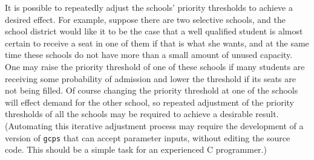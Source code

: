 \documentclass[12pt]{article}
\theoremstyle{definition}
\begin{document}
It is possible to repeatedly adjust the schools' priority thresholds
to achieve a desired effect.  For example, suppose there are two
selective schools, and the school district would like it to be the
case that a well qualified student is almost certain to receive a seat
in one of them if that is what she wants, and at the same time these
schools do not have more than a small amount of unused capacity.  One
may raise the priority threshold of one of these schools if many
students are receiving some probability of admission and lower the
threshold if its seats are not being filled.  Of course changing the
priority threshold at one of the schools will effect demand for the
other school, so repeated adjustment of the priority thresholds of all
the schools may be required to achieve a desirable result.
(Automating this iterative adjustment process may require the
development of a version of \texttt{gcps} that can accept parameter
inputs, without editing the source code.  This should be a simple task
for an experienced C programmer.)



\end{document}
